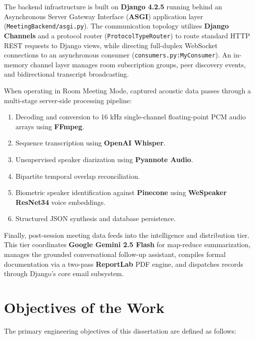 \documentclass[12pt,oneside,letterpaper]{report}
\numberwithin{equation}{chapter} %
\begin{document}
The backend infrastructure is built on \textbf{Django 4.2.5} running behind an Asynchronous Server Gateway Interface (\textbf{ASGI}) application layer (\texttt{MeetingBackend/asgi.py}). The communication topology utilizes \textbf{Django Channels} and a protocol router (\texttt{ProtocolTypeRouter}) to route standard HTTP REST requests to Django views, while directing full-duplex WebSocket connections to an asynchronous consumer (\texttt{consumers.py:MyConsumer}). An in-memory channel layer manages room subscription groups, peer discovery events, and bidirectional transcript broadcasting.

When operating in Room Meeting Mode, captured acoustic data passes through a multi-stage server-side processing pipeline:
\begin{enumerate}
    \item Decoding and conversion to 16 kHz single-channel floating-point PCM audio arrays using \textbf{FFmpeg}.
    \item Sequence transcription using \textbf{OpenAI Whisper}.
    \item Unsupervised speaker diarization using \textbf{Pyannote Audio}.
    \item Bipartite temporal overlap reconciliation.
    \item Biometric speaker identification against \textbf{Pinecone} using \textbf{WeSpeaker ResNet34} voice embeddings.
    \item Structured JSON synthesis and database persistence.
\end{enumerate}

Finally, post-session meeting data feeds into the intelligence and distribution tier. This tier coordinates \textbf{Google Gemini 2.5 Flash} for map-reduce summarization, manages the grounded conversational follow-up assistant, compiles formal documentation via a two-pass \textbf{ReportLab} PDF engine, and dispatches records through Django's core email subsystem.

\section{Objectives of the Work}
The primary engineering objectives of this dissertation are defined as follows:
\end{document}

